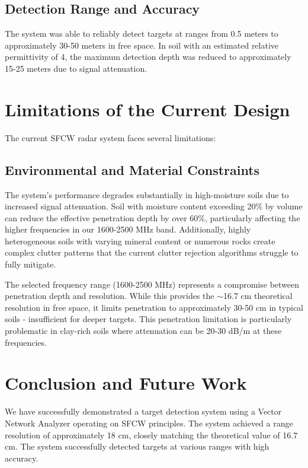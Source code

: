 \documentclass[11pt,a4paper]{article}
\begin{document}
\subsection{Detection Range and Accuracy}

The system was able to reliably detect targets at ranges from 0.5 meters to approximately 30-50 meters in free space. In soil with an estimated relative permittivity of 4, the maximum detection depth was reduced to approximately 15-25 meters due to signal attenuation.

\section{Limitations of the Current Design}

The current SFCW radar system faces several limitations:

\subsection{Environmental and Material Constraints}

The system's performance degrades substantially in high-moisture soils due to increased signal attenuation. Soil with moisture content exceeding 20\% by volume can reduce the effective penetration depth by over 60\%, particularly affecting the higher frequencies in our 1600-2500 MHz band. Additionally, highly heterogeneous soils with varying mineral content or numerous rocks create complex clutter patterns that the current clutter rejection algorithms struggle to fully mitigate.

The selected frequency range (1600-2500 MHz) represents a compromise between penetration depth and resolution. While this provides the $\sim$16.7 cm theoretical resolution in free space, it limits penetration to approximately 30-50 cm in typical soils - insufficient for deeper targets. This penetration limitation is particularly problematic in clay-rich soils where attenuation can be 20-30 dB/m at these frequencies.

\section{Conclusion and Future Work}

We have successfully demonstrated a target detection system using a Vector Network Analyzer operating on SFCW principles. The system achieved a range resolution of approximately 18 cm, closely matching the theoretical value of 16.7 cm. The system successfully detected targets at various ranges with high accuracy.
\end{document}
